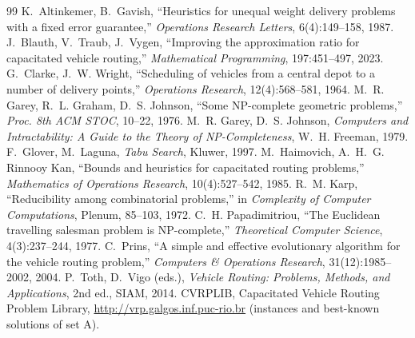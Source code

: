\documentclass[11pt,a4paper]{article}
\theoremstyle{definition}
\theoremstyle{remark}
\begin{document}
\begin{thebibliography}{99}
K.~Altinkemer, B.~Gavish, ``Heuristics for unequal weight delivery problems with a fixed
error guarantee,'' \emph{Operations Research Letters}, 6(4):149--158, 1987.
J.~Blauth, V.~Traub, J.~Vygen, ``Improving the approximation ratio for capacitated vehicle
routing,'' \emph{Mathematical Programming}, 197:451--497, 2023.
G.~Clarke, J.~W. Wright, ``Scheduling of vehicles from a central depot to a number of
delivery points,'' \emph{Operations Research}, 12(4):568--581, 1964.
M.~R. Garey, R.~L. Graham, D.~S. Johnson, ``Some NP-complete geometric problems,''
\emph{Proc. 8th ACM STOC}, 10--22, 1976.
M.~R. Garey, D.~S. Johnson, \emph{Computers and Intractability: A Guide to the Theory of
NP-Completeness}, W.~H. Freeman, 1979.
F.~Glover, M.~Laguna, \emph{Tabu Search}, Kluwer, 1997.
M.~Haimovich, A.~H.~G. Rinnooy Kan, ``Bounds and heuristics for capacitated routing
problems,'' \emph{Mathematics of Operations Research}, 10(4):527--542, 1985.
R.~M. Karp, ``Reducibility among combinatorial problems,'' in \emph{Complexity of Computer
Computations}, Plenum, 85--103, 1972.
C.~H. Papadimitriou, ``The Euclidean travelling salesman problem is NP-complete,''
\emph{Theoretical Computer Science}, 4(3):237--244, 1977.
C.~Prins, ``A simple and effective evolutionary algorithm for the vehicle routing problem,''
\emph{Computers \& Operations Research}, 31(12):1985--2002, 2004.
P.~Toth, D.~Vigo (eds.), \emph{Vehicle Routing: Problems, Methods, and Applications},
2nd ed., SIAM, 2014.
CVRPLIB, Capacitated Vehicle Routing Problem Library, \url{http://vrp.galgos.inf.puc-rio.br}
(instances and best-known solutions of set A).
\end{thebibliography}
\end{document}
